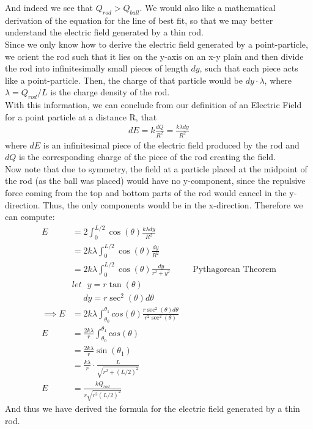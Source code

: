 \documentclass[oneside,12pt]{amsart}
\begin{document}
	\indent And indeed we see that $Q_{rod}>Q_{ball}$. We would also like a mathematical derivation of the equation for the line of best fit, so that we may better understand the electric field generated by a thin rod.\\
	
	\indent Since we only know how to derive the electric field generated by a point-particle, we orient the rod such that it lies on the y-axis on an x-y plain and then divide the rod into infinitesimally small pieces of length $dy$, such that each piece acts like a point-particle. Then, the charge of that particle would be $dy\cdot \lambda$, where $\lambda = Q_{rod}/L$ is the charge density of the rod.\\
	
	\indent With this information, we can conclude from our definition of an Electric Field for a point particle at a distance R, that 
	\begin{align*}
	 dE = k\frac{dQ}{R^2} = \frac{k\lambda dy}{R^2}
	\end{align*}
	where $dE$ is an infinitesimal piece of the electric field produced by the rod and $dQ$ is the corresponding charge of the piece of the rod creating the field.\\
	
	\indent Now note that due to symmetry, the field at a particle placed at the midpoint of the rod (as the ball was placed) would have no y-component, since the repulsive force coming from the top and bottom parts of the rod would cancel in the y-direction. Thus, the only components would be in the x-direction. Therefore we can compute:
	\begin{align*}
	E &= 2\int_0^{L/2}\cos(\theta)\frac{k\lambda dy}{R^2}\\
	&=2k\lambda \int_0^{L/2} \cos(\theta)\frac{dy}{R^2}\\
	&=2k\lambda \int_0^{L/2} \cos(\theta)\frac{dy}{r^2+y^2} &&\text{Pythagorean Theorem}\\
	&let\:\:\:y=r\tan(\theta)\\
	&\:\:\: \:\:\:dy = r\sec^2(\theta)d\theta\\
	\implies E&=2k\lambda \int_{\theta_0}^{\theta_1} cos(\theta) \frac{r\sec^2(\theta)d\theta}{r^2\sec^2(\theta)}\\
	E&=\frac{2k\lambda}{r} \int_{\theta_0}^{\theta_1} cos(\theta) \\
	&=\frac{2k\lambda}{r}\sin(\theta_1)\\
	&=\frac{k\lambda}{r}\cdot\frac{L}{\sqrt{r^2+(L/2)^2}}\\
	E&= \frac{kQ_{rod}}{r\sqrt{r^2(L/2)^2}}
	\end{align*}
	And thus we have derived the formula for the electric field generated by a thin rod.
	
\end{document}
